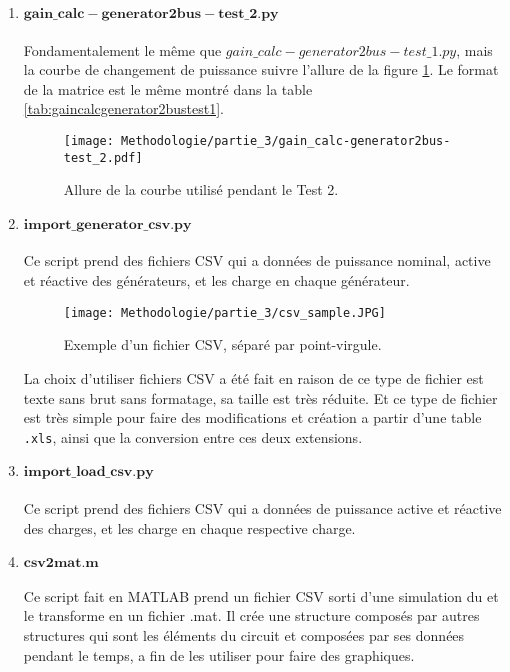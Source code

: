 \begin{enumerate}[\bfseries 4.3.1]
	\item $\mathbf{gain\_calc-generator2bus-test\_2.py}$\\
	\\Fondamentalement le même que $gain\_calc-generator2bus-test\_1.py$, mais la courbe de changement de puissance suivre l'allure de la figure \ref{fig:gaincalcgenerator2bustest2}. Le format de la matrice est le même montré dans la table \ref{tab:gaincalcgenerator2bustest1}.
	\begin{figure}[H]
		\begin{center}	
			\texttt{[image: Methodologie/partie\_3/gain\_calc-generator2bus-test\_2.pdf]}
			\caption{Allure de la courbe utilisé pendant le Test 2.}
			\label{fig:gaincalcgenerator2bustest2}
		\end{center}
	\end{figure}
	\item $\mathbf{import\_generator\_csv.py}$\\
	\\Ce script prend des fichiers \gls{CSV} qui a données de puissance nominal, active et réactive des générateurs, et les charge en chaque générateur.
	\begin{figure}[H]
		\begin{center}	
			\texttt{[image: Methodologie/partie\_3/csv\_sample.JPG]}
			\caption{Exemple d'un fichier CSV, séparé par point-virgule.}
			\label{fig:csv_sample}
		\end{center}
	\end{figure}
	La choix d'utiliser fichiers \gls{CSV} a été fait en raison de ce type de fichier est texte sans brut sans formatage, sa taille est très réduite. Et ce type de fichier est très simple pour faire des modifications et création a partir d'une table \verb|.xls|, ainsi que la conversion entre ces deux extensions.  
	\\
	\item $\mathbf{import\_load\_csv.py}$\\
	\\Ce script prend des fichiers \gls{CSV} qui a données de puissance active et réactive des charges, et les charge en chaque respective charge.
	\\
	\item $\mathbf{csv2mat.m}$\\
	\\Ce script fait en MATLAB prend un fichier \gls{CSV} sorti d'une simulation du \powerfactory et le transforme en un fichier .mat. Il crée une structure composés par autres structures qui sont les éléments du circuit et composées par ses données  pendant le temps, a fin de les utiliser pour faire des graphiques.

\end{enumerate}
